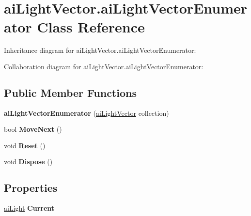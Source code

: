 \hypertarget{classai_light_vector_1_1ai_light_vector_enumerator}{\section{ai\+Light\+Vector.\+ai\+Light\+Vector\+Enumerator Class Reference}
\label{classai_light_vector_1_1ai_light_vector_enumerator}
}


Inheritance diagram for ai\+Light\+Vector.\+ai\+Light\+Vector\+Enumerator\+:


Collaboration diagram for ai\+Light\+Vector.\+ai\+Light\+Vector\+Enumerator\+:
\subsection*{Public Member Functions}
\begin{DoxyCompactItemize}
\item 
\hypertarget{classai_light_vector_1_1ai_light_vector_enumerator_a98c4e1ca113750c7bf0038279794d6b0}{{\bfseries ai\+Light\+Vector\+Enumerator} (\hyperlink{classai_light_vector}{ai\+Light\+Vector} collection)}\label{classai_light_vector_1_1ai_light_vector_enumerator_a98c4e1ca113750c7bf0038279794d6b0}

\item 
\hypertarget{classai_light_vector_1_1ai_light_vector_enumerator_a062d8ed877c94b21ae99405f448d0747}{bool {\bfseries Move\+Next} ()}\label{classai_light_vector_1_1ai_light_vector_enumerator_a062d8ed877c94b21ae99405f448d0747}

\item 
\hypertarget{classai_light_vector_1_1ai_light_vector_enumerator_a080ded13beb579eacc3df957fae690a7}{void {\bfseries Reset} ()}\label{classai_light_vector_1_1ai_light_vector_enumerator_a080ded13beb579eacc3df957fae690a7}

\item 
\hypertarget{classai_light_vector_1_1ai_light_vector_enumerator_a9f71fa1eed0f56782b24cf281499beb9}{void {\bfseries Dispose} ()}\label{classai_light_vector_1_1ai_light_vector_enumerator_a9f71fa1eed0f56782b24cf281499beb9}

\end{DoxyCompactItemize}
\subsection*{Properties}
\begin{DoxyCompactItemize}
\item 
\hypertarget{classai_light_vector_1_1ai_light_vector_enumerator_a72c4372fb3f564bd97d65c719c1bb906}{\hyperlink{structai_light}{ai\+Light} {\bfseries Current}}\label{classai_light_vector_1_1ai_light_vector_enumerator_a72c4372fb3f564bd97d65c719c1bb906}

\end{DoxyCompactItemize}


